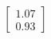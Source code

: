 \documentclass[preview]{standalone}
\begin{document}
\begin{align*}
\begin{bmatrix} 1.07 \\ 0.93 \end{bmatrix}
\end{align*}
\end{document}
